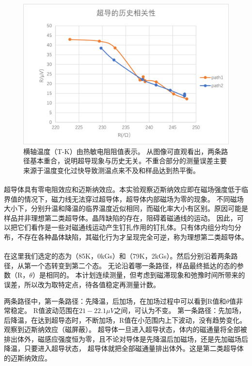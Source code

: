 \documentclass{ctexart}
\theoremstyle{ansstyle}
\begin{document}
\begin{figure}[H]
    \centering
    \includegraphics[width=1.0\linewidth]{./png/q3.png}
    \caption{横轴温度（T-K）由热敏电阻阻值表示。
        从图像可直观看出，两条路径基本重合，说明超导现象与历史无关。不重合部分的测量误差主要来源于温度变化过快导致测温点来不及和样品达到热平衡。
    }
\end{figure}

\paragraph*{}超导体具有零电阻效应和迈斯纳效应。本实验观察迈斯纳效应即在磁场强度低于临界值的情况下，磁力线无法穿过超导体，超导体内部磁场为零的现象。
不同磁场大小下，分别升温和降温的临界温度近似相同，而磁化率大小有区别。原因可能是样品并非理想第二类超导体。晶阵缺陷的存在，阻碍着磁通线的运动。
因此，可以把它们看作是一些对磁通线运动产生钉扎作用的钉扎体。只有体内组分均匀分布，不存在各种晶体缺陷，其磁化行为才呈现完全可逆，称为理想第二类超导体。
\paragraph{}在这里我们选定的态为（85K，0kGs）和（79K，2kGs）。然后分别沿着两条路径，从第一个态转变到第二个态。
无论沿着哪一条路径，样品最终抵达的态的参数（R，$\theta$）是相同的。
本计划连续测量，但考虑到磁滞现象和弛豫时间所带来的误差，所以改为取特定点，待各值稳定再测量计数。

两条路径中，第一条路径：先降温，后加场，在加场过程中可以看到R值和$\theta$值非常稳定。
R值波动范围在$21-22.1\mu V$之间，可认为不变。
第一条路径：先加场，后降温，在达到超导态时，不断加场，R值在小范围内上下波动，没有趋势变化。观察到迈斯纳效应（磁屏蔽）。
超导体一旦进入超导状态，体内的磁通量将全部被排出体外，磁感应强度恒为零，且不论对导体是先降温后加磁场，还是先加磁场后降温，只要进入超导状态，
超导体就把全部磁通量排出体外。这是第二类超导体的迈斯纳效应。
\end{document}
